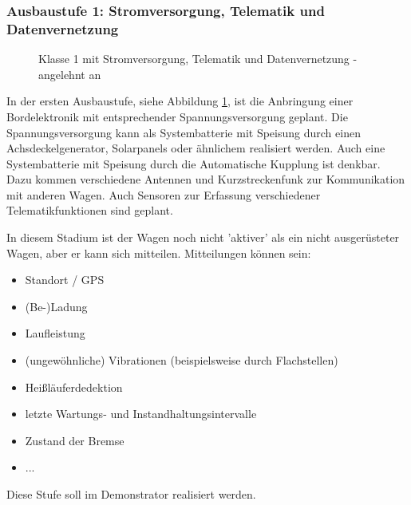 \subsubsection{Ausbaustufe 1: Stromversorgung, Telematik und Datenvernetzung}
\begin{figure}[hbp] 
    
    \caption{Klasse 1 mit Stromversorgung, Telematik und Datenvernetzung - angelehnt an \cite{ETR_3} }
    \label{fig:Klasse1}
\end{figure} 
In der ersten Ausbaustufe, siehe Abbildung \ref{fig:Klasse1}, ist die Anbringung einer Bordelektronik mit  entsprechender Spannungsversorgung geplant. Die Spannungsversorgung kann als Systembatterie mit Speisung durch einen Achsdeckelgenerator, Solarpanels oder ähnlichem realisiert werden. Auch eine Systembatterie mit Speisung durch die Automatische Kupplung ist denkbar. Dazu kommen verschiedene Antennen und Kurzstreckenfunk zur Kommunikation mit anderen Wagen. Auch Sensoren zur Erfassung verschiedener Telematikfunktionen sind geplant.\par
In diesem Stadium ist der Wagen noch nicht 'aktiver' als ein nicht ausgerüsteter Wagen, aber er kann sich mitteilen. Mitteilungen können sein: 
\begin{itemize}
    \item Standort / GPS
    \item (Be-)Ladung
    \item Laufleistung
    \item (ungewöhnliche) Vibrationen (beispielsweise durch Flachstellen)
    \item Heißläuferdedektion
    \item letzte Wartungs- und Instandhaltungsintervalle
    \item Zustand der Bremse
    \item ...
\end{itemize}
Diese Stufe soll im Demonstrator realisiert werden.

